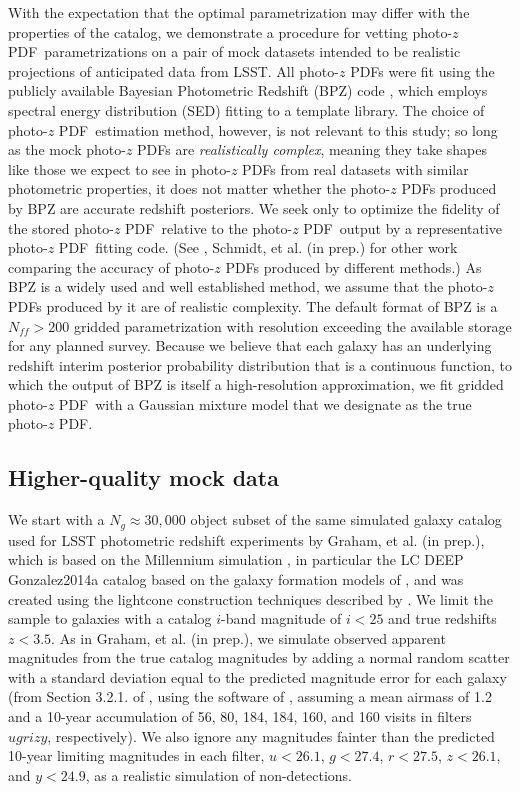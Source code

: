 \documentclass[\docopts]{\docclass}
\newcommand{\pz}{photo-$z$ PDF}
\begin{document}
With the expectation that the optimal parametrization may differ with the 
properties of the catalog, we demonstrate a procedure for vetting \pz\ 
parametrizations on a pair of mock datasets intended to be realistic 
projections of anticipated data from LSST.  All \pz s were fit using the 
publicly available Bayesian Photometric Redshift (BPZ) code 
\citep{benitez_bayesian_2000}, which employs spectral energy distribution (SED) 
fitting to a template library.  The choice of \pz\ estimation method, however, 
is not relevant to this study; so long as the mock \pz s are 
\textit{realistically complex}, meaning they take shapes like those we expect 
to see in \pz s from real datasets with similar photometric properties, it does 
not matter whether the \pz s produced by BPZ are accurate redshift posteriors.  
We seek only to optimize the fidelity of the stored \pz\ relative to the \pz\ 
output by a representative \pz\ fitting code.  (See 
\citet{tanaka_photometric_2017}, Schmidt, et al. (in prep.) for other work 
comparing the accuracy of \pz s produced by different methods.)  As BPZ is a 
widely used and well established method, we assume that the \pz s produced by 
it are of realistic complexity.  The default format of BPZ is a $N_{ff}>200$ 
gridded parametrization with resolution exceeding the available storage for any 
planned survey.  Because we believe that each galaxy has an underlying redshift 
interim posterior probability distribution that is a continuous function, to 
which the output of BPZ is itself a high-resolution approximation, we fit 
gridded \pz\ with a Gaussian mixture model that we designate as the true \pz.

\subsection{Higher-quality mock data}
\label{sec:Euclid}

We start with a $N_{g}\approx30,000$ object subset of the same simulated galaxy 
catalog used for LSST photometric redshift experiments by Graham, et al. (in 
prep.), which is based on the Millennium simulation 
\citep{springel_simulations_2005}, in particular the LC DEEP Gonzalez2014a
catalog based on the galaxy formation models of \cite{gonzalez-perez_how_2014}, 
and was created using the lightcone construction techniques described by 
\cite{merson_lightcone_2013}.  We limit the sample to galaxies with a catalog 
$i$-band magnitude of $i<25$ and true redshifts $z<3.5$. As in Graham, et al. 
(in prep.), we simulate observed apparent magnitudes from the true catalog 
magnitudes by adding a normal random scatter with a standard deviation equal to 
the predicted magnitude error for each galaxy (from Section 3.2.1. of 
\citealt{ivezic_lsst:_2008}, using the software of 
\citealt{connolly_end--end_2014}, assuming a mean airmass of 1.2 and a 10-year 
accumulation of 56, 80, 184, 184, 160, and 160 visits in filters $ugrizy$, 
respectively).  We also ignore any magnitudes fainter than the predicted 
10-year limiting magnitudes in each filter, $u<26.1$, $g<27.4$, $r<27.5$, 
$z<26.1$, and $y<24.9$, as a realistic simulation of non-detections.
\end{document}
